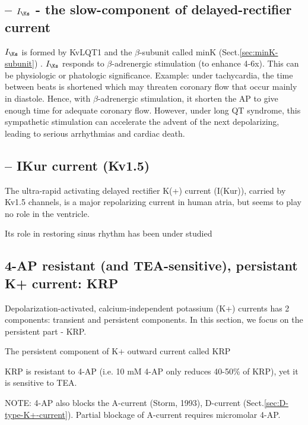 \subsection{-- $I_\Ks$ - the slow-component of delayed-rectifier current}
\label{sec:IKs_current}

 \citep{iost1998, li1996}
 
$I_\Ks$ is formed by KvLQT1 and the $\beta$-subunit called minK
(Sect.\ref{sec:minK-subunit})  \citep{barhanin1996, sanguinetti1996}. $I_\Ks$
responds to $\beta$-adrenergic stimulation (to enhance
4-6x)\citep{kurokawa2001}. This can be physiologic or phatologic significance.
Example: under tachycardia, the time between beats is shortened which may
threaten coronary flow that occur mainly in diastole. Hence, with
$\beta$-adrenergic stimulation, it shorten the AP to give enough time for
adequate coronary flow. However, under long QT syndrome, this sympathetic
stimulation can accelerate the advent of the next depolarizing, leading to
serious arrhythmias and cardiac death.


\subsection{-- IKur current (Kv1.5)}
\label{sec:IKur_current}

The ultra-rapid activating delayed rectifier K(+) current (I(Kur)), carried by
Kv1.5 channels, is a major repolarizing current in human atria, but seems to
play no role in the ventricle.

Its role in restoring sinus rhythm has been under studied \citep{tamargo2009}
 

\subsection{4-AP resistant (and TEA-sensitive), persistant K+ current:
KRP}
\label{sec:KRP}

Depolarization-activated, calcium-independent potassium
(K+) currents has 2 components: transient and persistent components. In this
section, we focus on the persistent part - KRP.

The persistent component of K+ outward current called KRP 

KRP is resistant to 4-AP (i.e. 10 mM 4-AP only reduces 40-50\% of KRP), yet it
is sensitive to TEA.

NOTE: 4-AP also blocks the A-current (Storm, 1993), D-current
(Sect.\ref{sec:D-type-K+-current}). Partial blockage of A-current requires
micromolar 4-AP.


